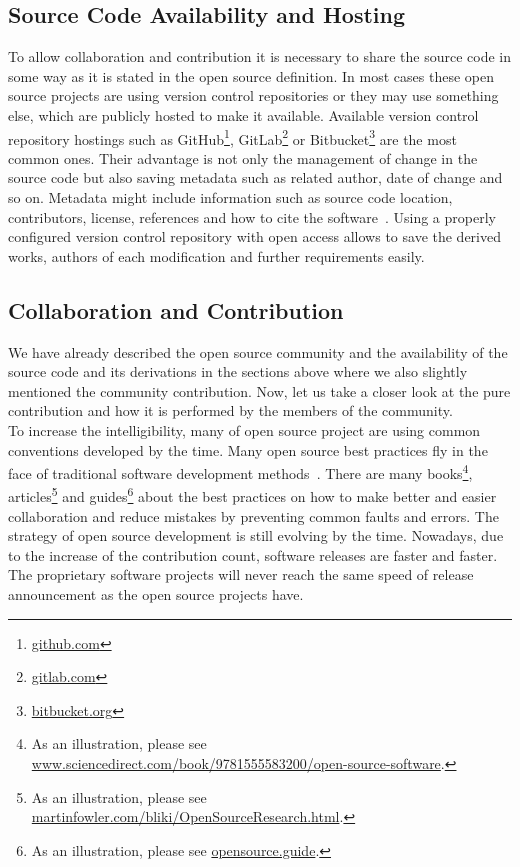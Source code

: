 \documentclass[12pt,a4paper]{article}
\theoremstyle{definition}
\begin{document}
    \subsection{Source Code Availability and Hosting}

    To allow collaboration and contribution it is necessary to share the source code in some way as it is stated in the open source definition. In most cases these open source projects are using version control repositories or they may use something else, which are publicly hosted to make it available. Available version control repository hostings such as GitHub\footnote{\href{https://github.com/}{github.com}}, GitLab\footnote{\href{https://gitlab.com/}{gitlab.com}} or Bitbucket\footnote{\href{https://bitbucket.org/}{bitbucket.org}} are the most common ones. Their advantage is not only the management of change in the source code but also saving metadata such as related author, date of change and so on. Metadata might include information such as source code location, contributors, license, references and how to cite the software~\cite{IEEE:OS-BP}. Using a properly configured version control repository with open access allows to save the derived works, authors of each modification and further requirements easily.

    \subsection{Collaboration and Contribution}

    We have already described the open source community and the availability of the source code and its derivations in the sections above where we also slightly mentioned the community contribution. Now, let us take a closer look at the pure contribution and how it is performed by the members of the community.\\

    To increase the intelligibility, many of open source project are using common conventions developed by the time. Many open source best practices fly in the face of traditional software development methods~\cite{KATSAMAKAS2019100872}. There are many books\footnote{As an illustration, please see \href{https://www.sciencedirect.com/book/9781555583200/open-source-software}{www.sciencedirect.com/book/9781555583200/open-source-software}.}, articles\footnote{As an illustration, please see \href{https://martinfowler.com/bliki/OpenSourceResearch.html}{martinfowler.com/bliki/OpenSourceResearch.html}.} and guides\footnote{As an illustration, please see \href{https://opensource.guide/}{opensource.guide}.} about the best practices on how to make better and easier collaboration and reduce mistakes by preventing common faults and errors. The strategy of open source development is still evolving by the time. Nowadays, due to the increase of the contribution count, software releases are faster and faster. The proprietary software projects will never reach the same speed of release announcement as the open source projects have.
\end{document}
